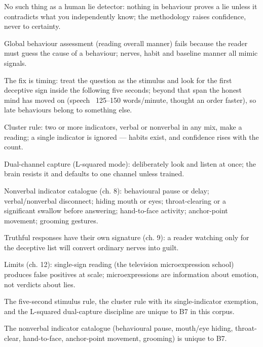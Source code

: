 \begin{distilled}
  \item No such thing as a human lie detector: nothing in behaviour proves a lie unless it contradicts what you independently know; the methodology raises confidence, never to certainty.
  \item Global behaviour assessment (reading overall manner) fails because the reader must guess the cause of a behaviour; nerves, habit and baseline manner all mimic signals.
  \item The fix is timing: treat the question as the stimulus and look for the first deceptive sign inside the following five seconds; beyond that span the honest mind has moved on (speech ~125--150 words/minute, thought an order faster), so late behaviours belong to something else.
  \item Cluster rule: two or more indicators, verbal or nonverbal in any mix, make a reading; a single indicator is ignored --- habits exist, and confidence rises with the count.
  \item Dual-channel capture (L-squared mode): deliberately look and listen at once; the brain resists it and defaults to one channel unless trained.
  \item Nonverbal indicator catalogue (ch. 8): behavioural pause or delay; verbal/nonverbal disconnect; hiding mouth or eyes; throat-clearing or a significant swallow before answering; hand-to-face activity; anchor-point movement; grooming gestures.
  \item Truthful responses have their own signature (ch. 9): a reader watching only for the deceptive list will convert ordinary nerves into guilt.
  \item Limits (ch. 12): single-sign reading (the television microexpression school) produces false positives at scale; microexpressions are information about emotion, not verdicts about lies.
\end{distilled}
\begin{unique}
  \item The five-second stimulus rule, the cluster rule with its single-indicator exemption, and the L-squared dual-capture discipline are unique to B7 in this corpus.
  \item The nonverbal indicator catalogue (behavioural pause, mouth/eye hiding, throat-clear, hand-to-face, anchor-point movement, grooming) is unique to B7.
\end{unique}
